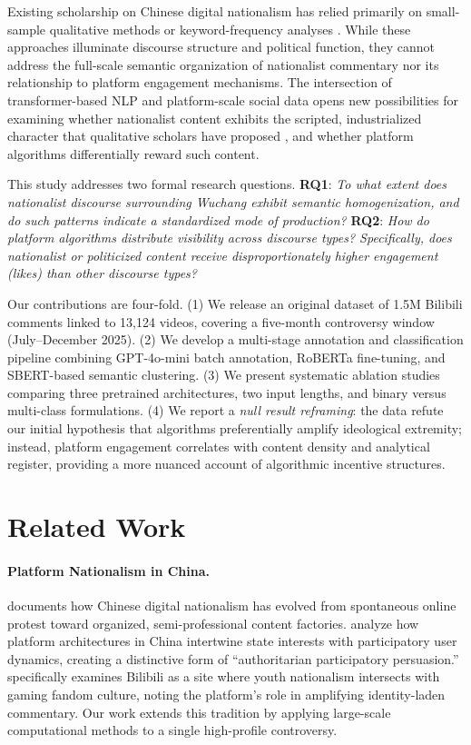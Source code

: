 \documentclass[letterpaper]{article}
\begin{document}
Existing scholarship on Chinese digital nationalism has relied primarily on small-sample qualitative methods or keyword-frequency analyses \citep{schneider2018, repnikova2018}. While these approaches illuminate discourse structure and political function, they cannot address the full-scale semantic organization of nationalist commentary nor its relationship to platform engagement mechanisms. The intersection of transformer-based NLP and platform-scale social data opens new possibilities for examining whether nationalist content exhibits the scripted, industrialized character that qualitative scholars have proposed \citep{schneider2018}, and whether platform algorithms differentially reward such content.

This study addresses two formal research questions. \textbf{RQ1}: \textit{To what extent does nationalist discourse surrounding Wuchang exhibit semantic homogenization, and do such patterns indicate a standardized mode of production?} \textbf{RQ2}: \textit{How do platform algorithms distribute visibility across discourse types? Specifically, does nationalist or politicized content receive disproportionately higher engagement (likes) than other discourse types?}

Our contributions are four-fold. (1) We release an original dataset of 1.5M Bilibili comments linked to 13,124 videos, covering a five-month controversy window (July--December 2025). (2) We develop a multi-stage annotation and classification pipeline combining GPT-4o-mini batch annotation, RoBERTa fine-tuning, and SBERT-based semantic clustering. (3) We present systematic ablation studies comparing three pretrained architectures, two input lengths, and binary versus multi-class formulations. (4) We report a \textit{null result reframing}: the data refute our initial hypothesis that algorithms preferentially amplify ideological extremity; instead, platform engagement correlates with content density and analytical register, providing a more nuanced account of algorithmic incentive structures.

\section{Related Work}

\paragraph{Platform Nationalism in China.}
\citet{schneider2018} documents how Chinese digital nationalism has evolved from spontaneous online protest toward organized, semi-professional content factories. \citet{repnikova2018} analyze how platform architectures in China intertwine state interests with participatory user dynamics, creating a distinctive form of ``authoritarian participatory persuasion.'' \citet{wu2022bilibili} specifically examines Bilibili as a site where youth nationalism intersects with gaming fandom culture, noting the platform's role in amplifying identity-laden commentary. Our work extends this tradition by applying large-scale computational methods to a single high-profile controversy.
\end{document}
